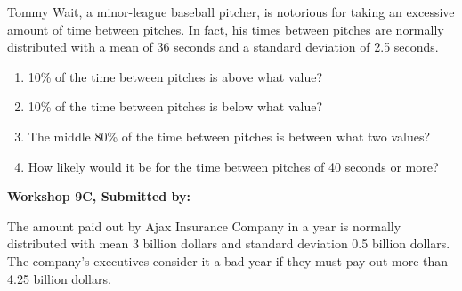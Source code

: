\documentclass[11pt, chapterprefix=true]{scrbook}\usepackage[]{graphicx}\usepackage[]{color}
\begin{document}
\begin{exercises}
\begin{exercise}
Tommy Wait, a minor-league baseball pitcher, is notorious for taking an excessive amount of time between pitches. In fact, his times between pitches are normally distributed with a mean of 36 seconds and a standard deviation of 2.5 seconds.

\begin{enumerate}
  \item 10\% of the time between pitches is above what value?
  \item 10\% of the time between pitches is below what value?
  \item The middle 80\% of the time between pitches is between what two values?
  \item How likely would it be for the time between pitches of 40 seconds or more? \end{enumerate}

\end{exercise} 
\begin{solution}  %

\end{solution} 
    
\clearpage

    \begin{exercise}  %

    \begin{center}
\begin{flushleft}\textbf{\large \hfill Workshop 9C, Submitted by: }\end{flushleft}

\end{center}

The amount paid out by Ajax Insurance Company in a year is normally distributed with mean 3 billion dollars and standard deviation 0.5 billion dollars. The company’s executives consider it a bad year if they must pay out more than 4.25 billion dollars. 


\end{exercise}
\end{exercises}
\end{document}
